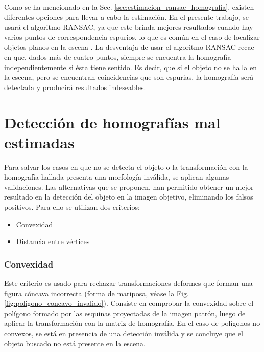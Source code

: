 Como se ha mencionado en la Sec. \ref{sec:estimacion_ransac_homografia}, existen diferentes opciones para llevar a cabo la estimación. En el presente trabajo, se usará el algoritmo RANSAC, ya que este brinda mejores resultados cuando hay varios puntos de correspondencia espurios, lo que es común en el caso de localizar objetos planos en la escena \cite{BenhimaneNGGNM08}. La desventaja de usar el algoritmo RANSAC recae en que, dados más de cuatro puntos, siempre se encuentra la homografía independientemente si ésta tiene sentido. Es decir, que si el objeto no se halla en la escena, pero se encuentran coincidencias que son espurias, la homografía será detectada y producirá resultados indeseables. %
\section{Detección de homografías mal estimadas}
\label{sec:salvado_convexidad_vertices}
Para salvar los casos en que no se detecta el objeto o la transformación con la homografía hallada presenta una morfología inválida, se aplican algunas validaciones. Las alternativas que se proponen, han permitido obtener un mejor resultado en la detección del objeto en la imagen objetivo, eliminando los falsos positivos. Para ello se utilizan dos criterios:
\begin{itemize}
 \item Convexidad
 \item Distancia entre vértices
\end{itemize}
\subsubsection{Convexidad}
Este criterio es usado para rechazar transformaciones deformes que forman una figura cóncava incorrecta (forma de mariposa, véase la Fig. \ref{fig:poligono_concavo_invalido}). Consiste en comprobar la convexidad sobre el polígono formado por las esquinas proyectadas de la imagen patrón, luego de aplicar la transformación con la matriz de homografía. En el caso de polígonos no convexos, se está en presencia de una detección inválida y se concluye que el objeto buscado no está presente en la escena. %
